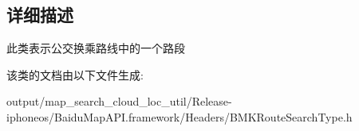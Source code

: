 \subsection{详细描述}
此类表示公交换乘路线中的一个路段 

该类的文档由以下文件生成\+:\begin{DoxyCompactItemize}
\item 
output/map\+\_\+search\+\_\+cloud\+\_\+loc\+\_\+util/\+Release-\/iphoneos/\+Baidu\+Map\+A\+P\+I.\+framework/\+Headers/B\+M\+K\+Route\+Search\+Type.\+h\end{DoxyCompactItemize}
